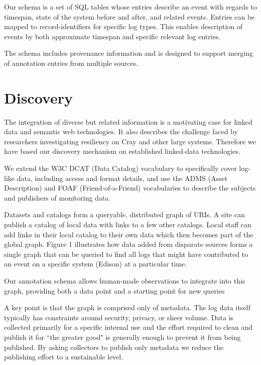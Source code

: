 Our schema is a set of SQL tables whose entries describe an event with regards
to timespan, state of the system before and after, and related events. Entries
can be mapped to record-identifiers for specific log types. This enables 
description of events by both approximate timespan and 
specific relevant log entries.

The schema includes provenance information and is designed to support merging of
annotation entries from multiple sources.

\section{Discovery}
The integration of diverse but related information is a motivating case for
linked data and semantic web technologies. It also describes the challenge
faced by researchers investigating resiliency on Cray and other large systems.
Therefore we have based our discovery mechanism on established linked-data
technologies.

We extend the W3C DCAT (Data Catalog) vocabulary to specifically cover log-like
data, including access and format details, and use the ADMS (Asset
Description) and FOAF (Friend-of-a-Friend) vocabularies to describe the subjects
and publishers of monitoring data.

Datasets and catalogs form a queryable, distributed graph of URIs. A site can
publish a catalog of local data with links to a few other catalogs. Local
staff can add links in their local catalog to their own data which then
becomes part of the global graph. Figure 1 illustrates how data added from
disparate sources forms a single graph that can be queried to find all logs
that might have contributed to an event on a specific system (Edison) at a
particular time.

Our annotation schema allows human-made observations to integrate into this
graph, providing both a data point and a starting point for new queries

A key point is that the graph is comprised only of metadata. The log data
itself typically has constraints around security, privacy, or sheer volume.
Data is collected primarily for a specific internal use and the effort required
to clean and publish it for ``the greater good" is generally enough to prevent it
from being published. By asking collectors to publish only metadata we reduce
the publishing effort to a sustainable level.


